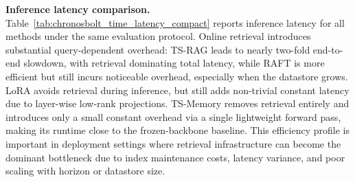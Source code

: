 \noindent\textbf{Inference latency comparison.}
Table~\ref{tab:chronosbolt_time_latency_compact} reports inference latency for all methods under the same evaluation protocol. Online retrieval introduces substantial query-dependent overhead: TS-RAG leads to nearly two-fold end-to-end slowdown, with retrieval dominating total latency, while RAFT is more efficient but still incurs noticeable overhead, especially when the datastore grows. LoRA avoids retrieval during inference, but still adds non-trivial constant latency due to layer-wise low-rank projections. TS-Memory removes retrieval entirely and introduces only a small constant overhead via a single lightweight forward pass, making its runtime close to the frozen-backbone baseline. This efficiency profile is important in deployment settings where retrieval infrastructure can become the dominant bottleneck due to index maintenance costs, latency variance, and poor scaling with horizon or datastore size.







